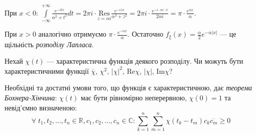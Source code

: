 \begin{example}
\begin{enumerate}
        При $x<0$: $\int\limits_{-\infty}^{+\infty} \frac{e^{-itx}}{\alpha^2 + t^2} dt = 2\pi i \cdot \underset{z=\alpha i}{\mathrm{Res}} \frac{e^{-izx}}{\alpha^2 + z^2} = 2\pi i \cdot \frac{e^{-i\cdot \alpha i\cdot x}}{2\alpha i} = \pi \cdot \frac{e^{\alpha x}}{\alpha}$.

        При $x>0$ аналогічно отримуємо $\pi \cdot \frac{e^{-\alpha x}}{\alpha}$.
        Остаточно $f_\xi(x) = \frac{\alpha}{2}e^{-\alpha |x|}$ --- це щільність \emph{розподілу Лапласа}.
    \end{enumerate}
\end{example}

\begin{exercise}
    Нехай $\chi(t)$ --- характеристична функція деякого розподілу. Чи можуть бути характеристичними функції $\overline{\chi}$, $\chi^2$, $|\chi|^2$, $\mathrm{Re}\chi$, $|\chi|$, $\mathrm{Im}\chi$? 
\end{exercise}

Необхідні та достатні умови того, що функція є характеристичною, дає
\emph{теорема Бохнера-Хінчина}: $\chi(t)$ має бути рівномірно неперервною, $\chi(0) = 1$ та 
невід'ємно визначеною: $$
    \forall \; t_1, t_2, ..., t_n \in \mathbb{R}, c_1, c_2, ..., c_n \in \mathbb{C}: 
    \sum\limits_{k=1}^n {\sum\limits_{m=1}^n \chi(t_k - t_m) c_k \overline{c_m}} \geq 0
$$

